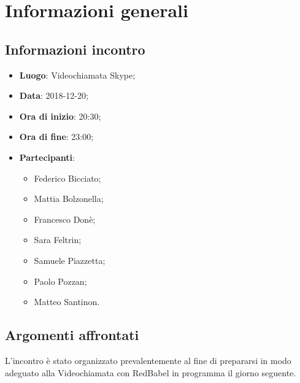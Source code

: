 \section{Informazioni generali}

\subsection{Informazioni incontro}
\begin{itemize}
\item \textbf{Luogo}: Videochiamata Skype;
\item \textbf{Data}: 2018-12-20;
\item \textbf{Ora di inizio}: 20:30;
\item \textbf{Ora di fine}: 23:00;
\item \textbf{Partecipanti}: 
	\begin{itemize}
		\item Federico Bicciato;
		\item Mattia Bolzonella;
		\item Francesco Donè;
		\item Sara Feltrin;
		\item Samuele Piazzetta;
		\item Paolo Pozzan;
		\item Matteo Santinon.
	\end{itemize}
\end{itemize}

\subsection{Argomenti affrontati}
L'incontro è stato organizzato prevalentemente al fine di prepararsi in modo 
adeguato alla Videochiamata con RedBabel in programma il giorno seguente.
